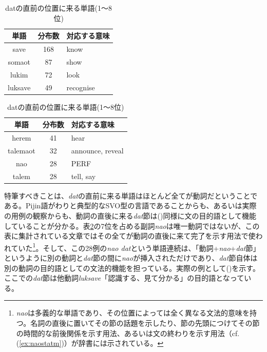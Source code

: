 \begin{table}[h]
  \caption{datの直前の位置に来る単語(1～8位)}
  \label{tb:datl1}
  \begin{minipage}{0.5\hsize}
  \begin{center}
    \begin{tabular}{|c||c|l|} \hline
      単語 & 分布数 & 対応する意味 \\ \hline \hline
      save & 168 & know\\ \hline
      somaot & 87 & show\\ \hline
      lukim & 72 & look\\ \hline
      luksave & 49 & recognise\\ \hline
    \end{tabular}
  \end{center}
  \end{minipage}
  \begin{minipage}{0.5\hsize}
    \begin{center}
      \begin{tabular}{|c||c|l|} \hline
        単語 & 分布数 & 対応する意味 \\ \hline \hline
        herem & 41 & hear \\ \hline
        talemaot & 32 & announce, reveal\\ \hline
        nao & 28 & PERF\\ \hline
        talem & 28 & tell, say\\ \hline
      \end{tabular}
    \end{center}
  \end{minipage}
\end{table}

特筆すべきことは、\textit{dat}の直前に来る単語はほとんど全てが動詞だということである。Pijin語がわりと典型的なSVO型の言語であることからも、あるいは実際の用例の観察からも、動詞の直後に来る\textit{dat}節は()同様に文の目的語として機能していることが分かる。表\ref{tb:datl1}の7位を占める副詞\textit{nao}は唯一動詞ではないが、この表に集計されている文章ではその全てが動詞の直後に来て完了を示す用法で使われていた\footnote{\textit{nao}は多義的な単語であり、その位置によっては全く異なる文法的意味を持つ。名詞の直後に置いてその節の話題を示したり、節の先頭につけてその節の時間的な前後関係を示す用法、あるいは文の終わりを示す用法（cf.(\ref{ex:naostatm})）が辞書\citep[145]{dictionary}には示されている。}。そして、この28例の\textit{nao dat}という単語連続は、「動詞+\textit{nao}+\textit{dat}節」というように別の動詞と\textit{dat}節の間に\textit{nao}が挿入されただけであり、\textit{dat}節自体は別の動詞の目的語としての文法的機能を担っている。実際の例として()を示す。ここでの\textit{dat}節は他動詞\textit{luksave}「認識する、見て分かる」の目的語となっている。

